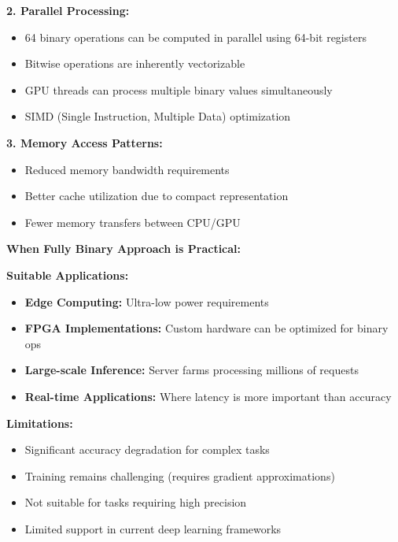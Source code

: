 \documentclass[12pt]{article}
\begin{document}
\begin{enumerate}[(a)]
{    \textbf{2. Parallel Processing:}
    \begin{itemize}
        \item 64 binary operations can be computed in parallel using 64-bit registers
        \item Bitwise operations are inherently vectorizable
        \item GPU threads can process multiple binary values simultaneously
        \item SIMD (Single Instruction, Multiple Data) optimization
    \end{itemize}
    
    \textbf{3. Memory Access Patterns:}
    \begin{itemize}
        \item Reduced memory bandwidth requirements
        \item Better cache utilization due to compact representation
        \item Fewer memory transfers between CPU/GPU
    \end{itemize}
    
    \textbf{When Fully Binary Approach is Practical:}
    
    \textbf{Suitable Applications:}
    \begin{itemize}
        \item \textbf{Edge Computing:} Ultra-low power requirements
        \item \textbf{FPGA Implementations:} Custom hardware can be optimized for binary ops
        \item \textbf{Large-scale Inference:} Server farms processing millions of requests
        \item \textbf{Real-time Applications:} Where latency is more important than accuracy
    \end{itemize}
    
    \textbf{Limitations:}
    \begin{itemize}
        \item Significant accuracy degradation for complex tasks
        \item Training remains challenging (requires gradient approximations)
        \item Not suitable for tasks requiring high precision
        \item Limited support in current deep learning frameworks
    \end{itemize}
    }
\end{enumerate}
\end{document}
